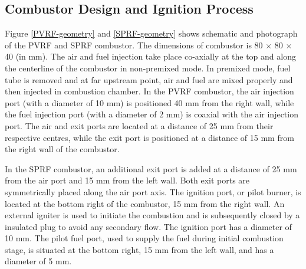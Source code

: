\subsection{Combustor Design and Ignition Process}
Figure \ref{PVRF-geometry} and \ref{SPRF-geometry} shows schematic and photograph of the PVRF and SPRF combustor. The dimensions of combustor is 80 $\times$ 80 $\times$ 40 (in mm). The air and fuel injection take place co-axially at the top and along the centerline of the combustor in non-premixed mode. In premixed mode, fuel tube is removed and at far upstream point, air and fuel are mixed properly and then injected in combustion chamber. In the PVRF combustor, the air injection port (with a diameter of 10 mm) is positioned 40 mm from the right wall, while the fuel injection port (with a diameter of 2 mm) is coaxial with the air injection port. The air and exit ports are located at a distance of 25 mm from their respective centres, while the exit port is positioned at a distance of 15 mm from the right wall of the combustor.

In the SPRF combustor, an additional exit port is added at a distance of 25 mm from the air port and 15 mm from the left wall. Both exit ports are symmetrically placed along the air port axis. The ignition port, or pilot burner, is located at the bottom right of the combustor, 15 mm from the right wall. An external igniter is used to initiate the combustion and is subsequently closed by a insulated plug to avoid any secondary flow. The ignition port has a diameter of 10 mm. The pilot fuel port, used to supply the fuel during initial combustion stage, is situated at the bottom right, 15 mm from the left wall, and has a diameter of 5 mm.

